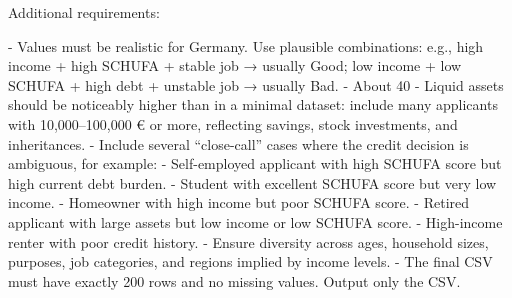 \begin{promptbox}
Additional requirements:

- Values must be realistic for Germany. Use plausible combinations: e.g., high income + high SCHUFA + stable job → usually Good; low income + low SCHUFA + high debt + unstable job → usually Bad.
- About 40%
- Liquid assets should be noticeably higher than in a minimal dataset: include many applicants with 10,000–100,000 € or more, reflecting savings, stock investments, and inheritances.
- Include several “close-call” cases where the credit decision is ambiguous, for example:
  - Self-employed applicant with high SCHUFA score but high current debt burden.
  - Student with excellent SCHUFA score but very low income.
  - Homeowner with high income but poor SCHUFA score.
  - Retired applicant with large assets but low income or low SCHUFA score.
  - High-income renter with poor credit history.
- Ensure diversity across ages, household sizes, purposes, job categories, and regions implied by income levels.
- The final CSV must have exactly 200 rows and no missing values. Output only the CSV.
\end{promptbox}

